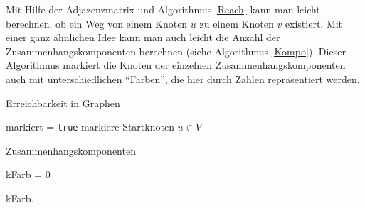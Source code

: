 Mit Hilfe der Adjazenzmatrix und Algorithmus \ref{Reach} kann man
leicht berechnen, ob ein Weg von einem Knoten $u$ zu einem Knoten $v$
existiert. Mit einer ganz ähnlichen Idee kann man auch leicht die
Anzahl der Zusammenhangskomponenten berechnen (siehe
Algorithmus \ref{Kompo}). Dieser Algorithmus markiert die Knoten der
einzelnen Zusammenhangskomponenten auch mit unterschiedlichen
"`Farben"', die hier durch Zahlen repräsentiert werden.

\begin{algorithm}
\caption{Erreichbarkeit in Graphen}
\label{Reach}
\BlankLine

markiert = \texttt{true}\;
markiere Startknoten $u \in V$\;

\BlankLine



\printsemicolon
\end{algorithm}

\begin{algorithm}
\caption{Zusammenhangskomponenten}
\label{Kompo}
\BlankLine
\printsemicolon

kFarb = 0\;

\BlankLine

\Return kFarb.
\end{algorithm}

